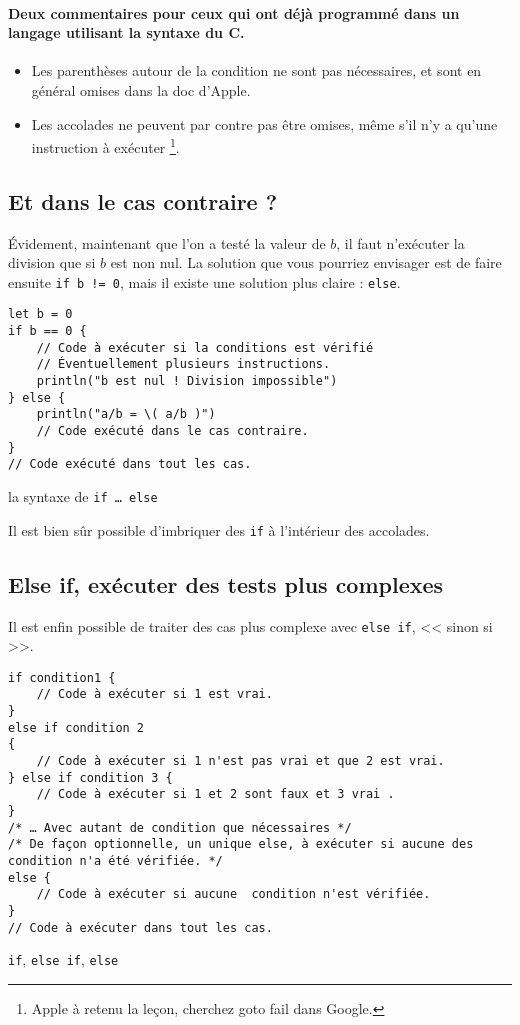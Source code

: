 \paragraph{Deux commentaires pour ceux qui ont déjà programmé
dans un langage utilisant la syntaxe du C.}
\begin{itemize}
\item Les parenthèses autour de la condition ne sont pas nécessaires,
et sont en général omises dans la doc d'Apple.
\item Les accolades ne peuvent par contre pas être omises,
même s'il n'y a qu'une instruction à exécuter
\footnote{Apple à retenu la leçon, cherchez \og goto fail \fg{} dans Google.}.
\end{itemize}
\subsection{Et dans le cas contraire ?}
Évidement, maintenant que l'on a testé la valeur de $b$, il faut n'exécuter la division que si $b$ est non nul.
La solution que vous pourriez envisager est de faire ensuite
\texttt{if b != 0},
mais il existe une solution plus claire : \texttt{else}.
\begin{listing}[h]
\begin{verbatim}
let b = 0
if b == 0 {
    // Code à exécuter si la conditions est vérifié
    // Éventuellement plusieurs instructions.
    println("b est nul ! Division impossible")
} else {
    println("a/b = \( a/b )")
    // Code exécuté dans le cas contraire.
}
// Code exécuté dans tout les cas.
\end{verbatim}
\caption{la syntaxe de \texttt{if … else}}
\end{listing} %

Il est bien sûr possible d'imbriquer des \texttt{if} à l'intérieur des accolades.
\subsection{Else if, exécuter des tests plus complexes}
Il est enfin possible de traiter des cas plus complexe avec \texttt{else if}, << sinon si >>.

\begin{listing}[h]
\begin{verbatim}
if condition1 {
    // Code à exécuter si 1 est vrai.
}
else if condition 2
{
    // Code à exécuter si 1 n'est pas vrai et que 2 est vrai.
} else if condition 3 {
    // Code à exécuter si 1 et 2 sont faux et 3 vrai .
}
/* … Avec autant de condition que nécessaires */
/* De façon optionnelle, un unique else, à exécuter si aucune des condition n'a été vérifiée. */
else {
    // Code à exécuter si aucune  condition n'est vérifiée.
}
// Code à exécuter dans tout les cas.
\end{verbatim}
\caption{\texttt{if}, \texttt{else if}, \texttt{else}}
\end{listing}
